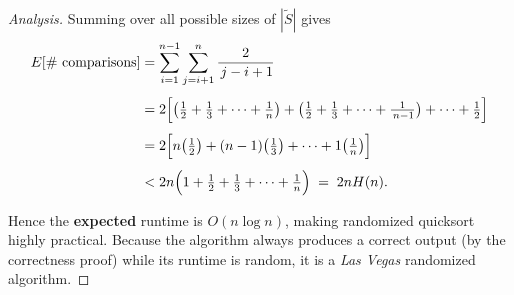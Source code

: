 \documentclass[12pt,a4paper]{article}
\newenvironment{analysis}[1][Analysis]%
{\begin{proof}[#1]}%
	{\end{proof}}
\begin{document}
\begin{analysis}
		Summing over all possible sizes of \(|\tilde{S}|\) gives
		\begin{align*}
			E[\text{\# comparisons}]
			&=\sum_{i=1}^{n-1}\sum_{j=i+1}^{n}\frac{2}{\,j-i+1}\\[4pt]
			&=2\Bigl[
			\bigl(\tfrac12+\tfrac13+\dots+\tfrac1n\bigr)
			+\bigl(\tfrac12+\tfrac13+\dots+\tfrac1{\,n-1}\bigr)
			+\dots
			+\tfrac12
			\Bigr]\\[4pt]
			&=2\Bigl[
			n\bigl(\tfrac12\bigr)
			+(n-1)\bigl(\tfrac13\bigr)
			+\dots
			+1\bigl(\tfrac1n\bigr)
			\Bigr]\\[4pt]
			&<2n\Bigl(1+\tfrac12+\tfrac13+\dots+\tfrac1n\Bigr)
			\;=\;2nH(n).
		\end{align*}
		
		Hence the \textbf{expected} runtime is \(O(n\log n)\), making randomized quicksort highly practical.  Because the algorithm always produces a correct output (by the correctness proof) while its runtime is random, it is a \emph{Las Vegas} randomized algorithm.
	\end{analysis}
	
\end{document}
